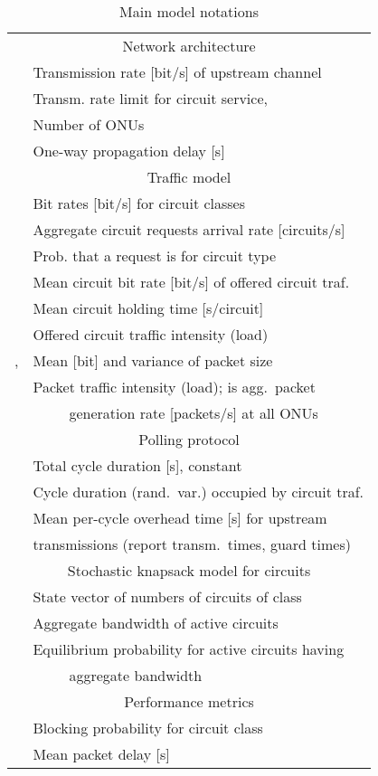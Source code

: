 \documentclass[article]{IEEEtran}
\begin{document}
\begin{table}
\caption{Main model notations}
\label{not:tab}
\begin{tabular}{|l|l|}  \hline
\multicolumn{2}{|c|}{Network architecture}\\
  & Transmission rate [bit/s] of upstream channel  \\
 & Transm. rate limit for circuit service,  \\
  & Number of ONUs \\
  & One-way propagation delay [s] \\
\hline
\multicolumn{2}{|c|}{Traffic model}\\
 & Bit rates [bit/s] for
         circuit classes \\
 & Aggregate circuit requests arrival rate [circuits/s]\\
 & Prob. that a request is for circuit type  \\
 & Mean circuit bit rate [bit/s] of offered
     circuit traf. \\
 & Mean circuit holding time [s/circuit] \\
 & Offered circuit traffic
            intensity (load) \\
,  & Mean [bit] and variance of packet size \\
 & Packet traffic intensity (load);
  is agg.\ packet  \\
   & \ \ \ \ \ generation rate [packets/s] at all  ONUs\\
\hline
\multicolumn{2}{|c|}{Polling protocol}\\
 & Total cycle duration [s], constant \\
 & Cycle duration (rand.\ var.) occupied by circuit traf. \\
 & Mean per-cycle overhead time [s] for upstream \\
   & transmissions (report transm.\ times, guard times) \\
\hline
\multicolumn{2}{|c|}{Stochastic knapsack model for circuits}\\
  & State vector of numbers of circuits
       of class \\
  & Aggregate bandwidth of active
 circuits\\
  & Equilibrium probability for active circuits having \\
        & \ \ \ \ \ aggregate
    bandwidth  \\ \hline
\multicolumn{2}{|c|}{Performance metrics}\\
 & Blocking probability for circuit class  \\
 & Mean packet delay [s]\\
\hline
\end{tabular}
\end{table}
\end{document}
